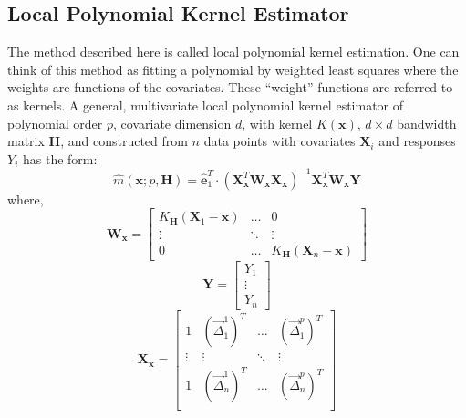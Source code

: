 \subsection{Local Polynomial Kernel
Estimator}\label{local-polynomial-kernel-estimator}

The method described here is called local polynomial kernel estimation.
One can think of this method as fitting a polynomial by weighted least
squares where the weights are functions of the covariates. These
``weight'' functions are referred to as kernels. A general, multivariate
local polynomial kernel estimator of polynomial order $p$, covariate
dimension $d$, with kernel $K(\mathbf{x})$, $d\times d$ bandwidth matrix
$\mathbf{H}$, and constructed from $n$ data points with covariates
$\mathbf{X}_{i}$ and responses $Y_i$ has the form: \[
\hat{m}(\mathbf{x};p,\mathbf{H})=\hat{\mathbf{e}}^T_1\cdot\left(
\mathbf{X}^T_{\mathbf{x}}\mathbf{W}_{\mathbf{x}}
\mathbf{X}_{\mathbf{x}}\right)^{-1}\mathbf{X}^T_{\mathbf{x}}
\mathbf{W}_{\mathbf{x}}\mathbf{Y}
\] where, \[
\mathbf{W}_{\mathbf{x}}=
\begin{bmatrix}
K_{\mathbf{H}}(\mathbf{X}_1-\mathbf{x}) &  \ldots & 0\\
\vdots  &  \ddots & \vdots\\
0  &\ldots & K_{\mathbf{H}}(\mathbf{X}_n-\mathbf{x})
\end{bmatrix}
\] \[
\mathbf{Y}=
\begin{bmatrix}
Y_1 \\
\vdots \\
Y_n
\end{bmatrix}
\] \[
\mathbf{X}_{\mathbf{x}}=
\begin{bmatrix}
1 & \left(\overrightarrow{\Delta}^1_1\right)^T &  \ldots & \left(\overrightarrow{\Delta}^p_1\right)^T\\
\vdots & \vdots &  \ddots & \vdots\\
1 & \left(\overrightarrow{\Delta}^1_n\right)^T &  \ldots & \left(\overrightarrow{\Delta}^p_n\right)^T\\
\end{bmatrix}
\]

